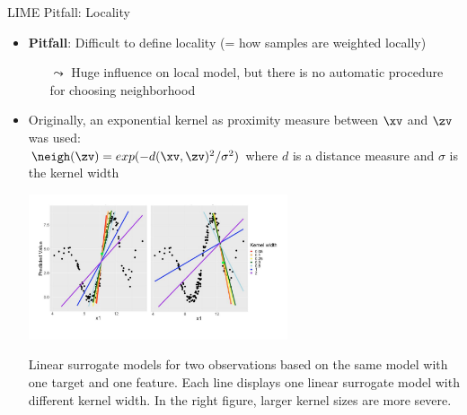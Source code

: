 \documentclass[11pt,compress,t,notes=noshow, aspectratio=169, xcolor=table]{beamer}
\begin{document}
\begin{vbframe}[c]{LIME Pitfall: Locality}

	\begin{itemize} 
     \item \textbf{Pitfall}: Difficult to define locality (= how samples are weighted locally) 
     \begin{itemize}
         \item[$\leadsto$] Huge influence on local model, but there is no automatic procedure for choosing neighborhood
     \end{itemize}
     \item Originally, an exponential kernel as proximity measure between $\xv$ and $\zv$ was used:\\
     	$\neigh(\zv) = exp(-d(\xv, \zv)^2/\sigma^2)$ where $d$ is a distance measure and $\sigma$ is the kernel width 
     	 \begin{center}
     		\includegraphics[width=0.6\textwidth]{figure/lime_locality}
     		\vspace{-0.5cm}
     		
     		\scriptsize{Linear surrogate models for two observations based on the same model with one target and one feature. Each line displays one linear surrogate model with different kernel width. In the right figure, larger kernel sizes are more severe.}
     		
     	\end{center}
     \end{itemize}
\end{vbframe}
\end{document}

